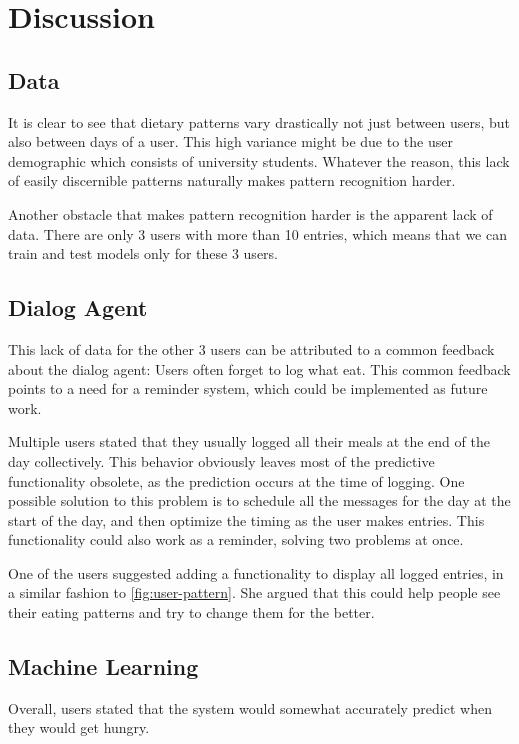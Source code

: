 
\chapter{Discussion}\label{chapter:discussion}

\section{Data}
It is clear to see that dietary patterns vary drastically not just between users, but also between days of a user.
This high variance might be due to the user demographic which consists of university students.
Whatever the reason, this lack of easily discernible patterns naturally makes pattern recognition harder.

Another obstacle that makes pattern recognition harder is the apparent lack of data.
There are only 3 users with more than 10 entries, which means that we can train and test models only for these 3 users.

\section{Dialog Agent}
This lack of data for the other 3 users can be attributed to a common feedback about the dialog agent:
Users often forget to log what eat.
This common feedback points to a need for a reminder system, which could be implemented as future work.

Multiple users stated that they usually logged all their meals at the end of the day collectively.
This behavior obviously leaves most of the predictive functionality obsolete, as the prediction occurs at the time of logging.
One possible solution to this problem is to schedule all the messages for the day at the start of the day, and then optimize the timing as the user makes entries.
This functionality could also work as a reminder, solving two problems at once.

One of the users suggested adding a functionality to display all logged entries, in a similar fashion to \autoref{fig:user-pattern}.
She argued that this could help people see their eating patterns and try to change them for the better.

\section{Machine Learning}
Overall, users stated that the system would somewhat accurately predict when they would get hungry.

